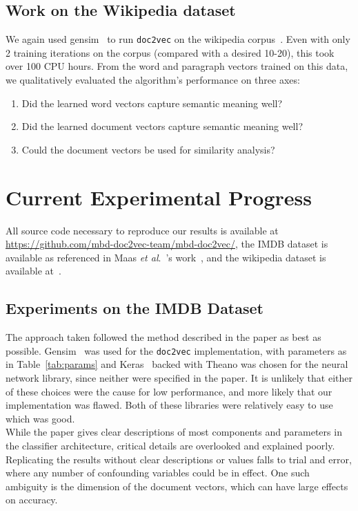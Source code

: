 \documentclass[11pt]{article}
\def\etal{\emph{et al}.\ }
\begin{document}
  \subsection*{Work on the Wikipedia dataset}
    We again used gensim~\cite{gensim} to run \texttt{doc2vec} on the wikipedia
    corpus~\cite{wikidatadump2016}. Even with only 2 training iterations on the
    corpus (compared with a desired 10-20), this took over 100 CPU hours.
    From the word and paragraph vectors trained on this data, we
    qualitatively evaluated the algorithm's performance on three axes:
    \begin{enumerate}
      \item Did the learned word vectors capture semantic meaning well?
      \item Did the learned document vectors capture semantic meaning well?
      \item Could the document vectors be used for similarity analysis?
    \end{enumerate}

\section*{Current Experimental Progress}
  All source code necessary to reproduce our results is available at
  \url{https://github.com/mbd-doc2vec-team/mbd-doc2vec/}, the IMDB dataset is
  available as referenced in Maas \etal's work~\cite{maas2011}, and the wikipedia
  dataset is available at~\cite{wikidatadump2016}.
  \subsection*{Experiments on the IMDB Dataset}
    The approach taken followed the method described in the paper as best as possible.
    Gensim~\cite{gensim} was used for the \texttt{doc2vec} implementation, with parameters as
    in Table~\ref{tab:params} and Keras~\cite{keras} backed with Theano was chosen for
    the neural network library, since neither were specified in the paper. It is unlikely
    that either of these choices were the cause for low performance, and more likely
    that our implementation was flawed. Both of these libraries were relatively easy
    to use which was good.\\
    While the paper gives clear descriptions of most components and parameters in the
    classifier architecture, critical details are overlooked and explained poorly.
    Replicating the results without clear descriptions or values falls to trial and
    error, where any number of confounding variables could be in effect.
    One such ambiguity is the dimension of the document vectors, which can have
    large effects on accuracy.
\end{document}
